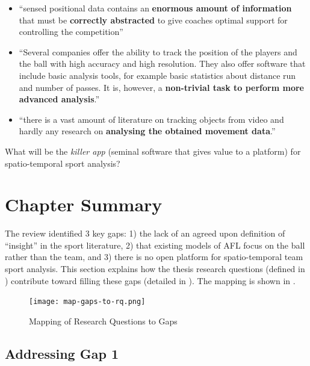 \begin{itemize}
\item
  ``sensed positional data contains an \textbf{enormous amount of
  information} that must be \textbf{correctly abstracted} to give
  coaches optimal support for controlling the competition''
  \cite{Beetz2005}
\item
  ``Several companies offer the ability to track the position of the
  players and the ball with high accuracy and high resolution. They also
  offer software that include basic analysis tools, for example basic
  statistics about distance run and number of passes. It is, however, a
  \textbf{non-trivial task to perform more advanced analysis}.''
  \cite{Gudmundsson2014}
\item
  ``there is a vast amount of literature on tracking objects from video
  and hardly any research on \textbf{analysing the obtained movement
  data}.'' \cite{Gudmundsson2014}
\end{itemize}

What will be the \emph{killer app} (seminal software that gives value to a platform) for spatio-temporal sport analysis?

\pagebreak{}

\section{Chapter Summary}\label{sec:gap-rq-mapping}

The review identified 3 key gaps: 1) the lack of an agreed upon definition of ``insight'' in the sport literature, 2) that existing models of AFL focus on the ball rather than the team, and 3) there is no open platform for spatio-temporal team sport analysis. This section explains how the thesis research questions (defined in ) contribute toward filling these gaps (detailed in ). The mapping is shown in .

\begin{figure}[htbp]
\centering
\texttt{[image: map-gaps-to-rq.png]}
\caption{Mapping of Research Questions to Gaps}
\label{fig:map-gaps-to-rq}
\end{figure}

\subsection*{Addressing Gap 1}

